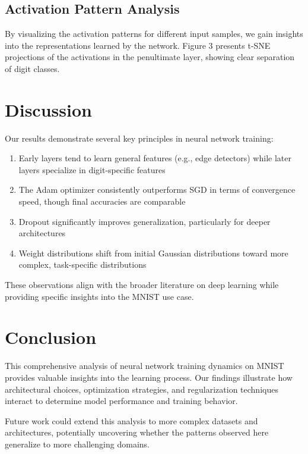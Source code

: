 \documentclass[
  11pt,
  twocolumn,
  a4paper]{article}
\providecommand{\tightlist}{%
  \setlength{\itemsep}{0pt}\setlength{\parskip}{0pt}}\usepackage{longtable,booktabs,array}
\begin{document}
\subsection{Activation Pattern
Analysis}\label{activation-pattern-analysis}

By visualizing the activation patterns for different input samples, we
gain insights into the representations learned by the network. Figure 3
presents t-SNE projections of the activations in the penultimate layer,
showing clear separation of digit classes.

\section{Discussion}\label{discussion}

Our results demonstrate several key principles in neural network
training:

\begin{enumerate}
\def\labelenumi{\arabic{enumi}.}
\tightlist
\item
  Early layers tend to learn general features (e.g., edge detectors)
  while later layers specialize in digit-specific features
\item
  The Adam optimizer consistently outperforms SGD in terms of
  convergence speed, though final accuracies are comparable
\item
  Dropout significantly improves generalization, particularly for deeper
  architectures
\item
  Weight distributions shift from initial Gaussian distributions toward
  more complex, task-specific distributions
\end{enumerate}

These observations align with the broader literature on deep learning
while providing specific insights into the MNIST use case.

\section{Conclusion}\label{conclusion}

This comprehensive analysis of neural network training dynamics on MNIST
provides valuable insights into the learning process. Our findings
illustrate how architectural choices, optimization strategies, and
regularization techniques interact to determine model performance and
training behavior.

Future work could extend this analysis to more complex datasets and
architectures, potentially uncovering whether the patterns observed here
generalize to more challenging domains.
\end{document}
